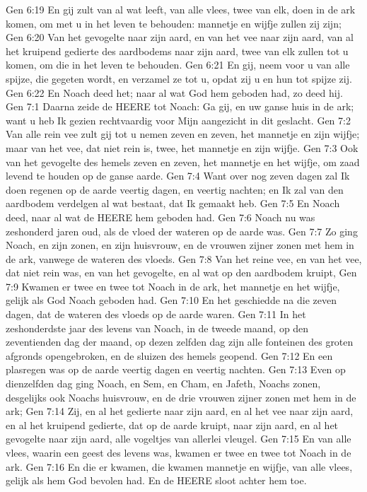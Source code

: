 Gen 6:19  En gij zult van al wat leeft, van alle vlees, twee van elk, doen in de ark komen, om met u in het leven te behouden: mannetje en wijfje zullen zij zijn;
Gen 6:20  Van het gevogelte naar zijn aard, en van het vee naar zijn aard, van al het kruipend gedierte des aardbodems naar zijn aard, twee van elk zullen tot u komen, om die in het leven te behouden.
Gen 6:21  En gij, neem voor u van alle spijze, die gegeten wordt, en verzamel ze tot u, opdat zij u en hun tot spijze zij.
Gen 6:22  En Noach deed het; naar al wat God hem geboden had, zo deed hij.
Gen 7:1  Daarna zeide de HEERE tot Noach: Ga gij, en uw ganse huis in de ark; want u heb Ik gezien rechtvaardig voor Mijn aangezicht in dit geslacht.
Gen 7:2  Van alle rein vee zult gij tot u nemen zeven en zeven, het mannetje en zijn wijfje; maar van het vee, dat niet rein is, twee, het mannetje en zijn wijfje.
Gen 7:3  Ook van het gevogelte des hemels zeven en zeven, het mannetje en het wijfje, om zaad levend te houden op de ganse aarde.
Gen 7:4  Want over nog zeven dagen zal Ik doen regenen op de aarde veertig dagen, en veertig nachten; en Ik zal van den aardbodem verdelgen al wat bestaat, dat Ik gemaakt heb.
Gen 7:5  En Noach deed, naar al wat de HEERE hem geboden had.
Gen 7:6  Noach nu was zeshonderd jaren oud, als de vloed der wateren op de aarde was.
Gen 7:7  Zo ging Noach, en zijn zonen, en zijn huisvrouw, en de vrouwen zijner zonen met hem in de ark, vanwege de wateren des vloeds.
Gen 7:8  Van het reine vee, en van het vee, dat niet rein was, en van het gevogelte, en al wat op den aardbodem kruipt,
Gen 7:9  Kwamen er twee en twee tot Noach in de ark, het mannetje en het wijfje, gelijk als God Noach geboden had.
Gen 7:10  En het geschiedde na die zeven dagen, dat de wateren des vloeds op de aarde waren.
Gen 7:11  In het zeshonderdste jaar des levens van Noach, in de tweede maand, op den zeventienden dag der maand, op dezen zelfden dag zijn alle fonteinen des groten afgronds opengebroken, en de sluizen des hemels geopend.
Gen 7:12  En een plasregen was op de aarde veertig dagen en veertig nachten.
Gen 7:13  Even op dienzelfden dag ging Noach, en Sem, en Cham, en Jafeth, Noachs zonen, desgelijks ook Noachs huisvrouw, en de drie vrouwen zijner zonen met hem in de ark;
Gen 7:14  Zij, en al het gedierte naar zijn aard, en al het vee naar zijn aard, en al het kruipend gedierte, dat op de aarde kruipt, naar zijn aard, en al het gevogelte naar zijn aard, alle vogeltjes van allerlei vleugel.
Gen 7:15  En van alle vlees, waarin een geest des levens was, kwamen er twee en twee tot Noach in de ark.
Gen 7:16  En die er kwamen, die kwamen mannetje en wijfje, van alle vlees, gelijk als hem God bevolen had. En de HEERE sloot achter hem toe.

